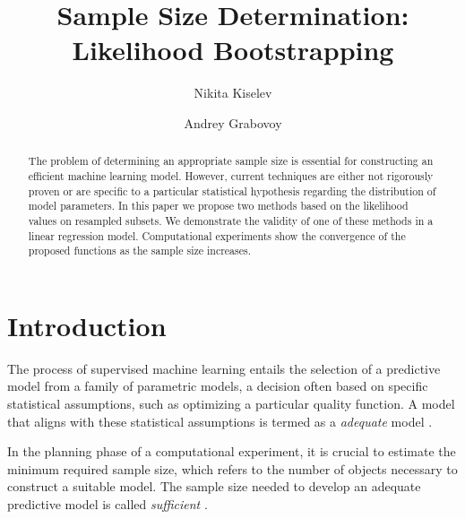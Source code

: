 \documentclass[runningheads]{llncs}
\begin{document}
%
\title{Sample Size Determination:\\Likelihood Bootstrapping}
%
%
\author{Nikita Kiselev \and Andrey Grabovoy}
%
%
%
\maketitle %
%
\begin{abstract}
The problem of determining an appropriate sample size is essential for constructing an efficient machine learning model. However, current techniques are either not rigorously proven or are specific to a particular statistical hypothesis regarding the distribution of model parameters. In this paper we propose two methods based on the likelihood values on resampled subsets. We demonstrate the validity of one of these methods in a linear regression model. Computational experiments show the convergence of the proposed functions as the sample size increases.

\end{abstract}
%
%
%
\section{Introduction}
The process of supervised machine learning entails the selection of a predictive model from a family of parametric models, a decision often based on specific statistical assumptions, such as optimizing a particular quality function. A model that aligns with these statistical assumptions is termed as a \textit{adequate} model \cite{bies2006genetic,cawley2010over,raschka2018model}.

In the planning phase of a computational experiment, it is crucial to estimate the minimum required sample size, which refers to the number of objects necessary to construct a suitable model. The sample size needed to develop an adequate predictive model is called \textit{sufficient} \cite{byrd2012sample,figueroa2012predicting,balki2019sample}. 
\end{document}
